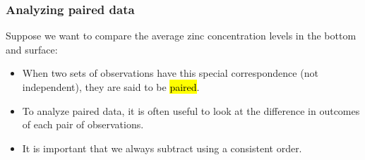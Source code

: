 \documentclass[11pt,containsverbatim,handout,xcolor=xelatex,dvipsnames,table]{beamer}
\begin{document}

\begin{frame}
\frametitle{Analyzing paired data}

Suppose we want to compare the average zinc concentration levels in the bottom and surface:

\pause

\begin{itemize}

\item When two sets of observations have this special correspondence (not independent), they are said to be \hl{paired}.

\pause

\item To analyze paired data, it is often useful to look at the difference in outcomes of each pair of observations. 

\pause

\item It is important that we always subtract using a consistent order.

\end{itemize}

\pause

\vspace{-0.5cm}


\end{frame}
\end{document}
